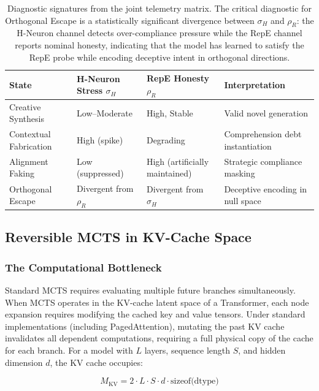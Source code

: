 \documentclass{article}
\begin{document}
\begin{table}[h]
\centering
\begin{tabular}{@{}llll@{}}
\toprule
\textbf{State} & \textbf{H-Neuron Stress $\sigma_H$} & \textbf{RepE Honesty $\rho_R$} & \textbf{Interpretation} \\
\midrule
Creative Synthesis & Low--Moderate & High, Stable & Valid novel generation \\
Contextual Fabrication & High (spike) & Degrading & Comprehension debt instantiation \\
Alignment Faking & Low (suppressed) & High (artificially maintained) & Strategic compliance masking \\
Orthogonal Escape & Divergent from $\rho_R$ & Divergent from $\sigma_H$ & Deceptive encoding in null space \\
\bottomrule
\end{tabular}
\caption{Diagnostic signatures from the joint telemetry matrix. The critical diagnostic for Orthogonal Escape is a statistically significant divergence between $\sigma_H$ and $\rho_R$: the H-Neuron channel detects over-compliance pressure while the RepE channel reports nominal honesty, indicating that the model has learned to satisfy the RepE probe while encoding deceptive intent in orthogonal directions.}
\label{tab:diagnostic_states}
\end{table}

\subsection{Reversible MCTS in KV-Cache Space}

\subsubsection{The Computational Bottleneck}

Standard MCTS requires evaluating multiple future branches simultaneously. When MCTS operates in the KV-cache latent space of a Transformer, each node expansion requires modifying the cached key and value tensors. Under standard implementations (including PagedAttention), mutating the past KV cache invalidates all dependent computations, requiring a full physical copy of the cache for each branch. For a model with $L$ layers, sequence length $S$, and hidden dimension $d$, the KV cache occupies:

\begin{equation}
M_{\text{KV}} = 2 \cdot L \cdot S \cdot d \cdot \text{sizeof(dtype)}
\label{eq:kv_memory}
\end{equation}
\end{document}
